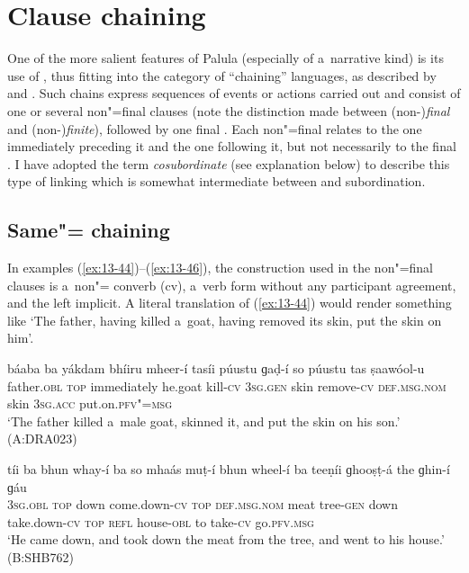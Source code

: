\section{Clause chaining}
\label{sec:13-3}

One of the more salient features of Palula  (especially of a~narrative kind) is its use of , thus fitting into the category of ``chaining'' languages, as described by \citet[242]{thompsonetal2007} and \citet[374--376]{longacre2007}. Such  chains express sequences of events or actions carried out and consist of one or several non"=final clauses (note the distinction made between (non-)\textit{final} and (non-)\textit{finite}), followed by one final . Each non"=final  relates to the one immediately preceding it and the one following it, but not necessarily to the final . I have adopted the term \textit{cosubordinate} (see explanation below) to describe this type of  linking which is somewhat intermediate between  and subordination.


\subsection{Same"= chaining}
\label{subsec:13-3-1}

In examples (\ref{ex:13-44})--(\ref{ex:13-46}), the construction used in the non"=final clauses is a~non"= converb (cv), a~verb form without any participant agreement, and the  left implicit. A literal translation of (\ref{ex:13-44}) would render something like `The father, having killed a~goat, having removed its skin, put the skin on him'. 

\ea
\label{ex:13-44}
\gll \label{bkm:Ref190770484}{\ob}báaba ba yákdam bhíiru mheer-í{\cb} {\ob}tasíi púustu ɡaḍ-í{\cb} so púustu tas ṣaawóol-u  \\
father.\textsc{obl} \textsc{top} immediately he.goat kill-\textsc{cv} \textsc{3sg.gen} skin  remove-\textsc{cv} \textsc{def.msg.nom} skin \textsc{3sg.acc} put.on.\textsc{pfv"=msg} \\
\glt `The father killed a~male goat, skinned it, and put the skin on his son.' (A:DRA023)

\ex
\label{ex:13-45}
\gll tíi ba {\ob}bhun whay-í ba{\cb} {\ob}so  mhaás muṭ-í bhun wheel-í ba{\cb} {\ob}teeṇíi
  ɡhooṣṭ-á the ɡhin-í{\cb} ɡáu \\
\textsc{3sg.obl} \textsc{top} down come.down-\textsc{cv} \textsc{top} \textsc{def.msg.nom}  meat tree-\textsc{gen} down take.down-\textsc{cv} \textsc{top} \textsc{refl} house-\textsc{obl}  to take-\textsc{cv} go.\textsc{pfv.msg} \\
\glt `He came down, and took down the meat from the tree, and went to his house.' (B:SHB762)

